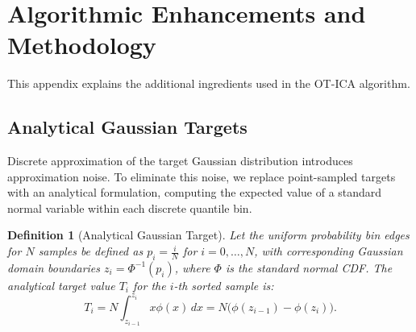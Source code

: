 \documentclass[accepted]{tpm2026} %
\newtheorem{definition}{Definition}
\begin{document}

\section{Algorithmic Enhancements and Methodology}
\label{app:methodology}
This appendix explains the additional ingredients used in the OT-ICA algorithm.
\subsection{Analytical Gaussian Targets}
Discrete approximation of the target Gaussian distribution introduces approximation noise. To eliminate this noise, 
we replace point-sampled targets with an analytical formulation, computing the expected value of a standard normal variable within each discrete quantile bin.

\begin{definition}[Analytical Gaussian Target]
Let the uniform probability bin edges for $N$ samples be defined as $p_i = \frac{i}{N}$ for $i = 0, \dots, N$, 
with corresponding Gaussian domain boundaries $z_i = \Phi^{-1}(p_i)$, where $\Phi$ is the standard normal CDF. The analytical target value $T_i$ for the $i$-th sorted sample is:
\begin{equation}
    T_i = N \int_{z_{i-1}}^{z_i} x \phi(x) \, dx = N \big( \phi(z_{i-1}) - \phi(z_i) \big).
\end{equation}
\end{definition}
\end{document}
